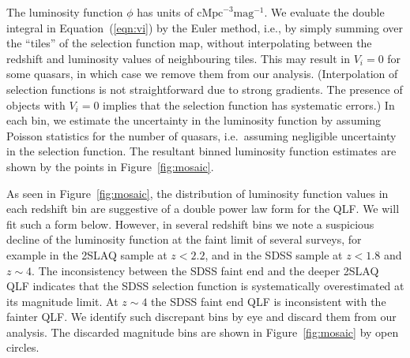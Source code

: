\documentclass[fleqn,usenatbib]{mnras}
\begin{document}
The luminosity function $\phi$ has units of
$\mathrm{cMpc}^{-3}\mathrm{mag}^{-1}$.  We evaluate the double
integral in Equation~(\ref{eqn:vi}) by the Euler method, i.e., by
simply summing over the ``tiles'' of the selection function map,
without interpolating between the redshift and luminosity values of
neighbouring tiles. 
This may result in $V_i=0$ for some quasars, in which case we remove
them from our analysis.  (Interpolation of selection functions is not
straightforward due to strong gradients.  The presence of objects with
$V_i=0$ implies that the selection function has systematic errors.)
In each bin, we estimate the uncertainty in the luminosity function by
assuming Poisson statistics \citep{1986ApJ...303..336G} for the number
of quasars, i.e.\ assuming negligible uncertainty in the selection function.
The resultant binned luminosity function estimates are shown by the
points in Figure~\ref{fig:mosaic}.

As seen in Figure~\ref{fig:mosaic}, the distribution of luminosity
function values in each redshift bin are suggestive of a double power
law form for the QLF.  We will fit such a form below. 
However, in several redshift bins we note a suspicious decline of the
luminosity function at the faint limit of several surveys, for example in
the 2SLAQ sample at $z<2.2$, and in the SDSS sample at $z<1.8$ and $z\sim 4$.
The inconsistency between the SDSS faint end and the deeper
2SLAQ QLF indicates that the SDSS selection function is
systematically overestimated at its magnitude limit.
At $z\sim 4$ the SDSS faint end QLF is inconsistent with the fainter
\citet{2011ApJ...728L..26G} QLF. We identify such discrepant bins
by eye and discard them from our analysis.
The discarded magnitude bins are shown in Figure~\ref{fig:mosaic} by
open circles.
\end{document}
